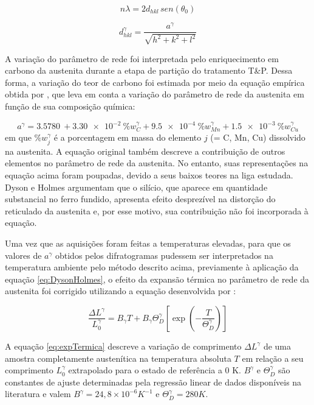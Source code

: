 \begin{equation}
  n\lambda = 2d_{hkl}\,sen(\theta_0)
  \label{eq:Bragg}
\end{equation}

\begin{equation}
  d_{hkl}^\gamma = \frac{a^\gamma}{\sqrt{h^2 + k^2 + l^2}}
  \label{eq:parametroRede}
\end{equation}

A variação do parâmetro de rede foi interpretada pelo enriquecimento em carbono da austenita durante a etapa de partição do tratamento T\&P. Dessa forma, a variação do teor de carbono foi estimada por meio da equação empírica obtida por , que leva em conta a variação do parâmetro de rede da austenita em função de sua composição química:

\begin{equation}
  a^\gamma = \SI{3.5780}{} + \SI{3.30e-2}{} \%w_C^\gamma + \SI{9.5e-4}{} \%w_{Mn}^\gamma + \SI{1.5e-3}{} \%w_{Cu}^\gamma
  \label{eq:DysonHolmes}
\end{equation}
%
em que $\%w_j^\gamma$ é a porcentagem em massa do elemento $j$ (= C, Mn, Cu) dissolvido na austenita. A equação original também descreve a contribuição de outros elementos no parâmetro de rede da austenita. No entanto, suas representações na equação acima foram poupadas, devido a seus baixos teores na liga estudada. Dyson e Holmes argumentam que o silício, que aparece em quantidade substancial no ferro fundido, apresenta efeito desprezível na distorção do reticulado da austenita e, por esse motivo, sua contribuição não foi incorporada à equação.

Uma vez que as aquisições foram feitas a temperaturas elevadas, para que os valores de $a^\gamma$ obtidos pelos difratogramas pudessem ser interpretados na temperatura ambiente pelo método descrito acima, previamente à aplicação da equação \ref{eq:DysonHolmes}, o efeito da expansão térmica no parâmetro de rede da austenita foi corrigido utilizando a equação desenvolvida por :

\begin{equation}
  \frac{\Delta L^\gamma}{L_0^\gamma} = B_\gamma T + B_\gamma \Theta_D^\gamma \left[ \exp{\left( -\frac{T}{\Theta_D^\gamma} \right)}\right]
  \label{eq:expTermica}
\end{equation}

A equação \ref{eq:expTermica} descreve a variação de comprimento $\Delta L^\gamma$ de uma amostra completamente austenítica na temperatura absoluta $T$ em relação a seu comprimento $L_0^\gamma$ extrapolado para o estado de referência a 0 K. $B^\gamma$ e $\Theta_D^\gamma$ são constantes de ajuste determinadas pela regressão linear de dados disponíveis na literatura e valem $B^\gamma = 24,8 \times 10^{-6} K^{-1}$ e $\Theta_D^\gamma = 280 K$.


